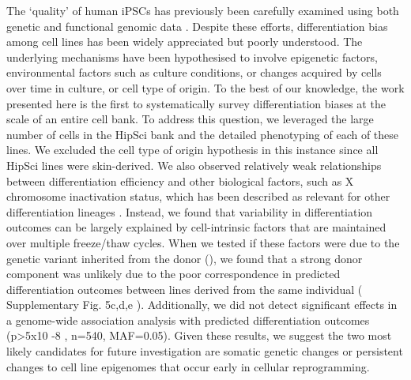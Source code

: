 The `quality' of human iPSCs has previously been carefully examined using both genetic and functional genomic data \cite{muller2011bioinformatic, international2018assessment, tsankov2015qpcr, bock2011reference}. 
Despite these efforts, differentiation bias among cell lines has been widely appreciated but poorly understood. 
The underlying mechanisms have been hypothesised to involve epigenetic factors, environmental factors such as culture conditions, or changes acquired by cells over time in culture, or cell type of origin. 
To the best of our knowledge, the work presented here is the first to systematically survey differentiation biases at the scale of an entire cell bank. 
To address this question, we leveraged the large number of cells in the HipSci bank and the detailed phenotyping of each of these lines. 
We excluded the cell type of origin hypothesis \cite{hu2016effects} in this instance since all HipSci lines were skin-derived.
We also observed relatively weak relationships between differentiation efficiency and other biological factors, such as X chromosome inactivation status, which has been described as relevant for other differentiation lineages \cite{cuomo2020single}.
Instead, we found that variability in differentiation outcomes can be largely explained by cell-intrinsic factors that are maintained over multiple freeze/thaw cycles. 
When we tested if these factors were due to the genetic variant inherited from the donor (\cite{kajiwara2012donor}), we found that a strong donor component was unlikely due to the poor
correspondence in predicted differentiation outcomes between lines derived from the same individual ( Supplementary Fig. 5c,d,e ). 
Additionally, we did not detect significant effects in a genome-wide association analysis with predicted differentiation outcomes (p>5x10 -8 , n=540, MAF=0.05). 
Given these results, we suggest the two most likely candidates for future investigation are somatic genetic changes or persistent changes to cell line epigenomes that occur early in cellular reprogramming.\\

